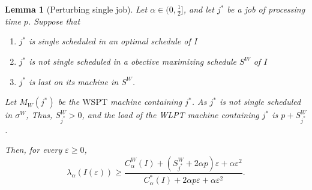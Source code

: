 \documentclass[11pt]{article}
\newtheorem{lemma}{Lemma}
\newcommand{\OptCost}{C_{\alpha}^{*}(I)}
\newcommand{\WorstCost}{C_{\alpha}^{W}(I)}
\begin{document}
\begin{lemma}[Perturbing single job]
\label{lem:critical-singleton-perturbation}
Let $\alpha\in(0,\tfrac12]$, and let $j^*$ be a job of processing
time $p$.  Suppose that
\begin{enumerate}
    \item $j^*$ is single scheduled in an optimal schedule of I
    \item $j^*$ is not single scheduled in a obective maximizing schedule $S^W$ of $I$
    \item $j^*$ is last on its machine in $S^W$.
\end{enumerate}
Let $M_{W}(j^*)$ be the \(\mathrm{WSPT}\) machine containing
$j^*$. As $j^*$ is not single scheduled in $\sigma^{W}$, 
Thus, $S^W_{j^*}>0$, and the load of the WLPT machine containing
$j^*$ is $p+S^W_{j^*}$.

Then, for every $\varepsilon\geq0$,
\begin{equation}
    \lambda_{\alpha}(I(\varepsilon))
    \geq
    \frac{
        \WorstCost+(S^W_{j^{*}}+2\alpha p)\varepsilon
        +\alpha\varepsilon^2
    }{
        \OptCost+2\alpha p\varepsilon
        +\alpha\varepsilon^2
    }.
    \label{eq:ratio-perturbation-bound}
\end{equation}
\end{lemma}
\end{document}
